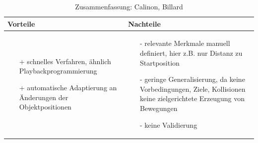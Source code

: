 \begin{table}[hbt]
\centering
\begin{tabular}{|p{6.5cm}|p{6.5cm}|}
\hline
Vorteile & Nachteile\\
\hline
\vspace{-5mm}
\begin{itemize}
\setlength\itemsep{0em}
\item[+] schnelles Verfahren, ähnlich Playbackprogrammierung
\item[+] automatische Adaptierung an Änderungen der Objektpositionen
\end{itemize}
 &
 \vspace{-5mm}
\begin{itemize}
\setlength\itemsep{0em}
\item[-] relevante Merkmale manuell definiert, hier z.B. nur Distanz zu Startposition
\item[-] geringe Generalisierung, da keine Vorbedingungen, Ziele, Kollisionen
 keine zielgerichtete Erzeugung von Bewegungen
\item[-] keine Validierung
\end{itemize}\\
\hline
\end{tabular}
\caption{Zusammenfassung: Calinon, Billard}
\label{tab:cabi}
\end{table}\\ 
